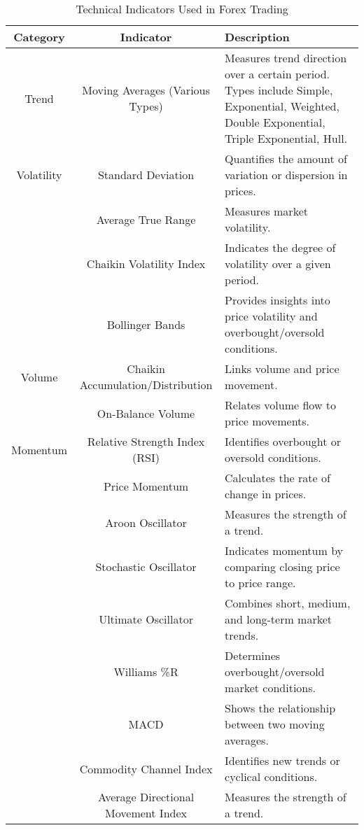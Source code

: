 \begin{table}[h]
\centering
\begin{tabular}{ |c|c|p{6cm}| }
\hline
Category & Indicator & Description \\
\hline
Trend & Moving Averages (Various Types) & Measures trend direction over a certain period. Types include Simple, Exponential, Weighted, Double Exponential, Triple Exponential, Hull. \\
\hline
Volatility & Standard Deviation & Quantifies the amount of variation or dispersion in prices. \\
& Average True Range & Measures market volatility. \\
& Chaikin Volatility Index & Indicates the degree of volatility over a given period. \\
& Bollinger Bands & Provides insights into price volatility and overbought/oversold conditions. \\
\hline
Volume & Chaikin Accumulation/Distribution & Links volume and price movement. \\
& On-Balance Volume & Relates volume flow to price movements. \\
\hline
Momentum & Relative Strength Index (RSI) & Identifies overbought or oversold conditions. \\
& Price Momentum & Calculates the rate of change in prices. \\
& Aroon Oscillator & Measures the strength of a trend. \\
& Stochastic Oscillator & Indicates momentum by comparing closing price to price range. \\
& Ultimate Oscillator & Combines short, medium, and long-term market trends. \\
& Williams \%R & Determines overbought/oversold market conditions. \\
& MACD & Shows the relationship between two moving averages. \\
& Commodity Channel Index & Identifies new trends or cyclical conditions. \\
& Average Directional Movement Index & Measures the strength of a trend. \\
\hline
\end{tabular}
\caption{Technical Indicators Used in Forex Trading}
\label{table:TechnicalIndicators}
\end{table}
